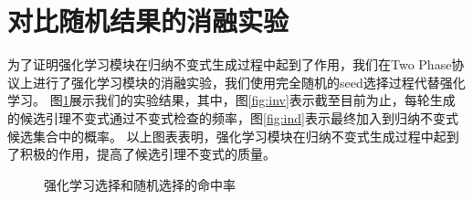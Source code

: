 \section{对比随机结果的消融实验}
为了证明强化学习模块在归纳不变式生成过程中起到了作用，我们在Two Phase协议上进行了强化学习模块的消融实验，我们使用完全随机的seed选择过程代替强化学习。
图\ref{fig:all}展示我们的实验结果，其中，图\ref{fig:inv}表示截至目前为止，每轮生成的候选引理不变式通过不变式检查的频率，图\ref{fig:ind}表示最终加入到归纳不变式候选集合中的概率。
以上图表表明，强化学习模块在归纳不变式生成过程中起到了积极的作用，提高了候选引理不变式的质量。
\begin{figure}[htb]
    \centering
    \hfill
    \hfill
    \caption{强化学习选择和随机选择的命中率}
    \label{fig:all}
\end{figure}
